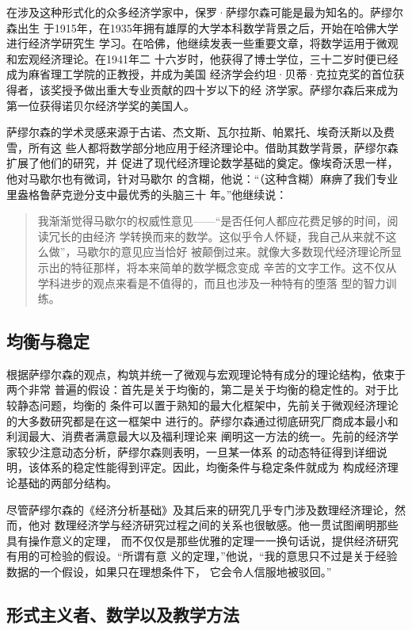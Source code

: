 在涉及这种形式化的众多经济学家中，保罗·萨缪尔森可能是最为知名的。萨缪尔森出生
于1915年，在1935年拥有雄厚的大学本科数学背景之后，开始在哈佛大学进行经济学研究生
学习。在哈佛，他继续发表一些重要文章，将数学运用于微观和宏观经济理论。在1941年二
十六岁时，他获得了博士学位，三十二岁时便已经成为麻省理工学院的正教授，并成为美国
经济学会约坦·贝蒂·克拉克奖的首位获得者，该奖授予做出重大专业贡献的四十岁以下的经
济学家。萨缪尔森后来成为第一位获得诺贝尔经济学奖的美国人。

萨缪尔森的学术灵感来源于古诺、杰文斯、瓦尔拉斯、帕累托、埃奇沃斯以及费雪，所有这
些人都将数学部分地应用于经济理论中。借助其数学背景，萨缪尔森扩展了他们的研究，并
促进了现代经济理论数学基础的奠定。像埃奇沃思一样，他对马歇尔也有微词，针对马歇尔
的含糊，他说：“（这种含糊）麻痹了我们专业里盎格鲁萨克逊分支中最优秀的头脑三十
年。”他继续说：
\begin{quotation}
  我渐渐觉得马歇尔的权威性意见——“是否任何人都应花费足够的时间，阅读冗长的由经济
  学转换而来的数学。这似乎令人怀疑，我自己从来就不这么做”，马歇尔的意见应当恰好
  被颠倒过来。就像大多数现代经济理论所显示出的特征那样，将本来简单的数学概念变成
  辛苦的文字工作。这不仅从学科进步的观点来看是不值得的，而且也涉及一种特有的堕落
  型的智力训练。
\end{quotation}

\subsection{均衡与稳定}

根据萨缪尔森的观点，构筑并统一了微观与宏观理论特有成分的理论结构，依束于两个非常
普遍的假设：首先是关于均衡的，第二是关于均衡的稳定性的。对于比较静态问题，均衡的
条件可以置于熟知的最大化框架中，先前关于微观经济理论的大多数研究都是在这一框架中
进行的。萨缪尔森通过彻底研究厂商成本最小和利润最大、消费者满意最大以及福利理论来
阐明这一方法的统一。先前的经济学家较少注意动态分析，萨缪尔森则表明，一旦某一体系
的动态特征得到详细说明，该体系的稳定性能得到评定。因此，均衡条件与稳定条件就成为
构成经济理论基础的两部分结构。

尽管萨缪尔森的《经济分析基础》及其后来的研究几乎专门涉及数理经济理论，然而，他对
数理经济学与经济研究过程之间的关系也很敏感。他一贯试图阐明那些具有操作意义的定理，
而不仅仅是那些优雅的定理一一换句话说，提供经济研究有用的可检验的假设。“所谓有意
义的定理，”他说，“我的意思只不过是关于经验数据的一个假设，如果只在理想条件下，
它会令人信服地被驳回。”

\subsection{形式主义者、数学以及教学方法}

